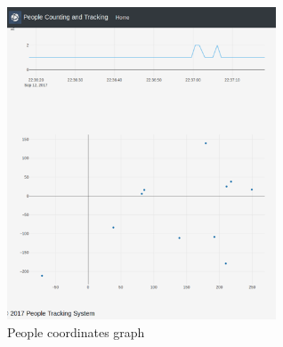 \documentclass[12pt,a4paper]{report}
\begin{document}
\begin{figure}[H]
\includegraphics[width=8cm]{graph1.png}
\centering
\caption{People 	coordinates graph}
\label{grapg1}
\end{figure}
\end{document}
